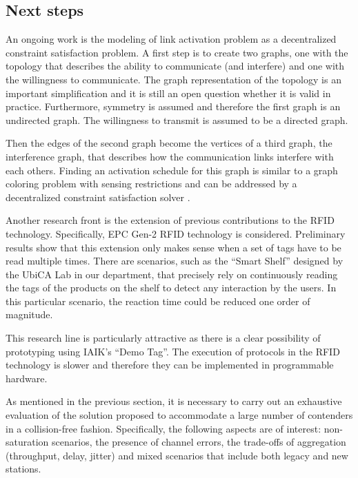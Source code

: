 \documentclass[a4paper,twocolumns]{article}%
\begin{document}
\subsection{Next steps}


An ongoing work is the modeling of link activation problem as a decentralized constraint satisfaction problem.
A first step is to create two graphs, one with the topology that describes the ability to communicate (and interfere) and one with the willingness to communicate.
The graph representation of the topology is an important simplification and it is still an open question whether it is valid in practice.
Furthermore, symmetry is assumed and therefore the first graph is an undirected graph.
The willingness to transmit is assumed to be a directed graph.

Then the edges of the second graph become the vertices of a third graph, the interference graph, that describes how the communication links interfere with each others.
Finding an activation schedule for this graph is similar to a graph coloring problem with sensing restrictions \cite{checco2012lbc} and can be addressed by a decentralized constraint satisfaction solver \cite{duffy2011dcs}.

Another research front is the extension of previous contributions to the RFID technology.
Specifically, EPC Gen-2 RFID technology is considered.
Preliminary results show that this extension only makes sense when a set of tags have to be read multiple times.
There are scenarios, such as the ``Smart Shelf'' designed by the UbiCA Lab in our department, that precisely rely on continuously reading the tags of the products on the shelf to detect any interaction by the users.
In this particular scenario, the reaction time could be reduced one order of magnitude.

This research line is particularly attractive as there is a clear possibility of prototyping using IAIK's ``Demo Tag''.
The execution of protocols in the RFID technology is slower and therefore they can be implemented in programmable hardware.

As mentioned in the previous section, it is necessary to carry out an exhaustive evaluation of the solution proposed to accommodate a large number of contenders in a collision-free fashion.
Specifically, the following aspects are of interest: non-saturation scenarios, the presence of channel errors, the trade-offs of aggregation (throughput, delay, jitter) and mixed scenarios that include both legacy and new stations.
\end{document}
